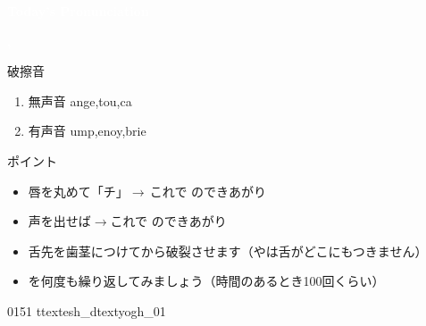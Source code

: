 \documentclass[aspectratio=169, xcolor={dvipsnames,table}]{beamer}
\begin{document}
\begin{frame}
  \centering
  \textcolor{white}{\Huge\bfseries Today's Pronunciation}\pause

  \vspace{30pt}

  \textcolor{white}{\Huge\bfseries {}, }
\end{frame}
\begin{frame}[plain,label=slide_ttextesh_dtextyogh]{破擦音}
  \large

  \begin{enumerate}
    \item 無声音 \hspace{20pt}ange,\hspace{1\zw}tou,\hspace{1\zw}ca

    \item 有声音 \hspace{20pt}ump,\hspace{1\zw}enoy,\hspace{1\zw}brie
  \end{enumerate}

  \vspace*{20pt}

  \normalsize ポイント

  \begin{itemize}
    [circle]

    \item 唇を丸めて「チ」$\rightarrow$\,これで\,\,のできあがり

    \item 声を出せば$\rightarrow$これで\,\,のできあがり

    \item 舌先を歯茎につけてから破裂させます（やは舌がどこにもつきません）

    \item {}を何度も繰り返してみましょう（時間のあるとき100回くらい）
  \end{itemize}
  \hfill{\tiny 0151}\,{\scriptsize {}}\,{\tiny ttextesh\_dtextyogh\_01}

\end{frame}
\end{document}
